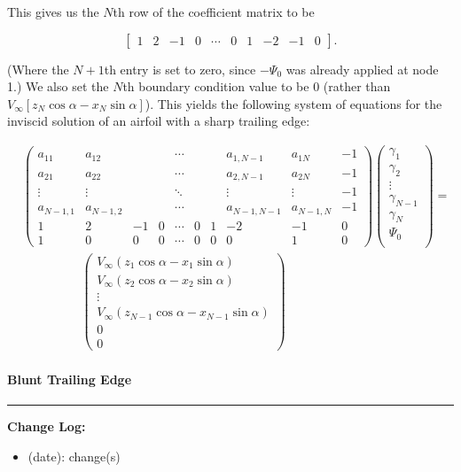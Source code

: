 \documentclass[]{article}
\begin{document}
\noindent This gives us the \(N\)th row of the coefficient matrix to be

\begin{equation}
	\begin{bmatrix}
		1 & 2 & -1 & 0 & \cdots & 0 & 1 & -2 & -1 & 0 
	\end{bmatrix}.
\end{equation}


\noindent (Where the \(N+1\)th entry is set to zero, since \(-\Psi_0\) was already applied at node 1.) We also set the \(N\)th boundary condition value to be 0 (rather than \(V_\infty[z_N\cos\alpha - x_N \sin\alpha]\)). 
This yields the following system of equations for the inviscid solution of an airfoil with a sharp trailing edge:

 \begin{equation}
 	\begin{split}
&	\begin{pmatrix}
		a_{11} & a_{12} & & & \cdots & & & a_{1,N-1} & a_{1N} & -1 \\
		a_{21} & a_{22} & & & \cdots & & & a_{2,N-1} & a_{2N} & -1 \\
		\vdots & \vdots & & & \ddots & & & \vdots & \vdots & -1 \\
		a_{N-1,1} & a_{N-1,2} & & & \cdots & & & a_{N-1,N-1} & a_{N-1,N} & -1 \\
		1 & 2 & -1 & 0 & \cdots & 0 & 1 & -2 & -1 & 0 \\
		1 & 0 & 0 & 0 & \cdots & 0 & 0 & 0 & 1 & 0
	\end{pmatrix}
	\begin{pmatrix}
		\gamma_1 \\
		\gamma_2 \\
		\vdots \\
		\gamma_{N-1} \\
		\gamma_N \\
		\Psi_0 \\
	\end{pmatrix}
	= \\
	& \hspace{2cm}\begin{pmatrix}
		V_\infty(z_1\cos\alpha - x_1 \sin\alpha) \\
		V_\infty(z_2\cos\alpha - x_2 \sin\alpha) \\
		\vdots \\
		V_\infty(z_{N-1}\cos\alpha - x_{N-1} \sin\alpha) \\
		0 \\
		0
	\end{pmatrix}
\end{split}
\end{equation}

\paragraph{Blunt Trailing Edge}






\newpage

{}


\vspace{1cm}
\hrule
\vspace{1cm}

\noindent  \textbf{Change Log:}

\begin{itemize}
	\item (date): change(s)
\end{itemize}
\end{document}
